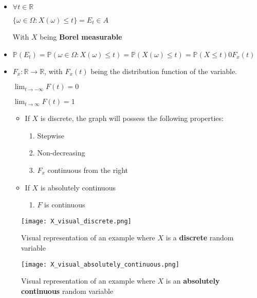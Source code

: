             \begin{itemize}
                \item \(\forall t \in \mathbb{R}\)

                    \( \{ \omega \in \Omega : X (\omega) \leq t \} = E_t \in A \)

                    With \(X\) being \textbf{Borel measurable}

                \item 

                    \( \mathbb{P} (E_t) = \mathbb{P} (\omega \in \Omega : X (\omega) \leq t ) = \mathbb{P} (X (\omega) \leq t) = \mathbb{P} (X \leq t)  0 F_x (t)  \)
 
                \item \(F_x : \mathbb{R} \rightarrow \mathbb{R}\), with \(F_x(t)\) being the distribution function of the variable.

                    \( \lim _{t \to - \infty} F(t) = 0 \)    

                    \( \lim _{t\to\infty} F(t) = 1\)

                    \begin{itemize}
                        \item If \(X\) is discrete, the graph will possess the following properties:
                            \begin{enumerate}
                                \item Stepwise
                                \item Non-decreasing 
                                \item \(F_x\) continuous from the right
                            \end{enumerate}
                        \item If \(X\) is \textcolor{dblue}{absolutely} continuous
                            \begin{enumerate}
                                \item \(F\) is continuous
                            \end{enumerate}
                    \end{itemize}
            \end{itemize}

            \begin{figure}[h]
                \centering
                \texttt{[image: X\_visual\_discrete.png]}
                \caption{Visual representation of an example where \(X\) is a \textbf{discrete} random variable}
                \label{fig:X_visual_discrete}
            \end{figure}

            \begin{figure}[h]
                \centering
                \texttt{[image: X\_visual\_absolutely\_continuous.png]}
                \caption{Visual representation of an example where \(X\) is an \textbf{absolutely continuous} random variable}
                \label{fig:X_visual_absolutely_continuous}
            \end{figure}
